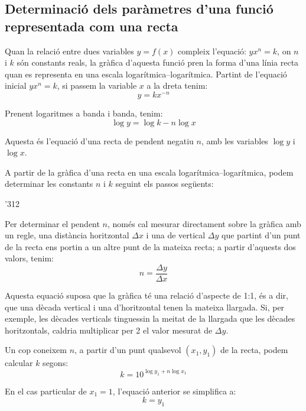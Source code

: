 \subsection{Determinació dels paràmetres d'una funció representada com una recta}

Quan la relació entre dues variables $y=f(x)$ compleix l'equació: $y x^n = k$, on $n$ i $k$  són constants  reals, la gràfica d'aquesta funció pren la forma d'una línia recta quan es representa en una escala logarítmica--logarítmica. Partint de l'equació inicial $y x^n = k$, si passem la variable $x$ a la dreta tenim:
\begin{equation}
  y = k x^{-n}
\end{equation}

Prenent logaritmes a banda i banda, tenim:
\begin{equation}
  \log y = \log k - n \log x
\end{equation}

Aquesta és l'equació d'una recta de pendent negatiu $n$, amb les variables $\log y$ i $\log x$.

A partir de la gràfica d'una recta en una escala logarítmica--logarítmica, podem determinar les constants $n$ i $k$ seguint els passos següents:

\begin{dingautolist}{'312}
    \item Per determinar el pendent $n$, només cal mesurar directament sobre la gràfica amb un regle, una distància horitzontal $\Delta{}x$ i una de vertical $\Delta{}y$ que partint d'un punt de la recta ens portin a un altre punt de la mateixa recta; a partir d'aquests dos valors, tenim:
        \begin{equation}
          n = \frac{\Delta{}y}{\Delta{}x}
        \end{equation}

        Aquesta equació suposa que la gràfica té una relació d'aspecte de 1:1, és a dir, que una dècada vertical i una d'horitzontal tenen la mateixa llargada. Si, per exemple, les dècades verticals tinguessin la meitat de la llargada que les dècades  horitzontals, caldria multiplicar per 2 el valor mesurat de $\Delta{}y$.

   \item  Un cop  coneixem $n$, a partir d'un punt qualsevol $(x_1, y_1)$ de la recta, podem calcular $k$ segons:
        \begin{equation}
          k = 10^{\log y_1 + n \log x_1}
        \end{equation}

        En el cas particular de $x_1=1$, l'equació anterior se simplifica a:\begin{equation}
           k = y_1
        \end{equation}
\end{dingautolist}

